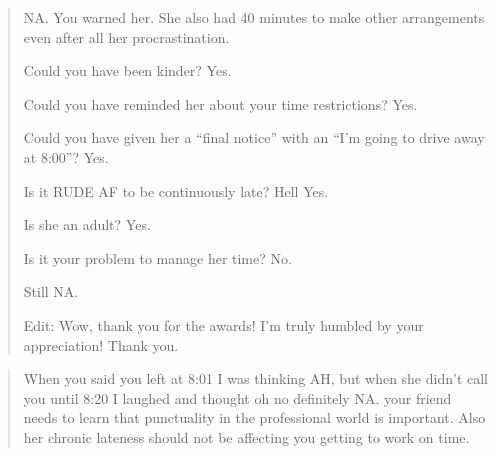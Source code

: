 
\begin{quote}
NA. You warned her. She also had 40 minutes to make other arrangements
even after all her procrastination.

Could you have been kinder? Yes.

Could you have reminded her about your time restrictions? Yes.

Could you have given her a ``final notice'' with an ``I'm going to
drive away at 8:00''? Yes.

Is it RUDE AF to be continuously late? Hell Yes.

Is she an adult? Yes.

Is it your problem to manage her time? No.

Still NA.

Edit: Wow, thank you for the awards! I'm truly humbled by your
appreciation! Thank you.
\end{quote}


\begin{quote}
When you said you left at 8:01 I was thinking AH, but when she didn't
call you until 8:20 I laughed and thought oh no definitely NA. your
friend needs to learn that punctuality in the professional world is
important. Also her chronic lateness should not be affecting you
getting to work on time.
\end{quote}


